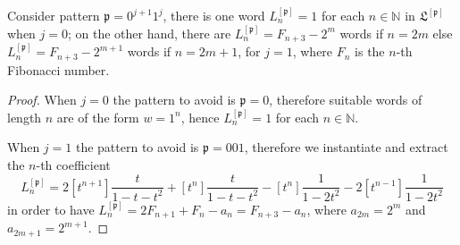 \begin{coro}
Consider pattern $\mathfrak{p}=0^{j+1}1^{j}$, there is one word
$L_{n}^{[\mathfrak{p}]} = 1$ for each $n\in\mathbb{N}$ in
$\mathfrak{L}^{[\mathfrak{p}]}$ when $j=0$; on the other hand, there are
$L_{n}^{[\mathfrak{p}]} = F_{n+3}-2^{m}$ words if $n=2m$ else
$L_{n}^{[\mathfrak{p}]} = F_{n+3}-2^{m+1}$ words if $n=2m+1$, for $j=1$, where
$F_{n}$ is the $n$-th Fibonacci number.
\end{coro}

\begin{proof}
When $j=0$ the pattern to avoid is $\mathfrak{p}=0$, therefore suitable
words of length $n$ are of the form $w=1^{n}$, hence $L_{n}^{[\mathfrak{p}]} =
1$ for each $n\in\mathbb{N}$.

When $j=1$ the pattern to avoid is $\mathfrak{p}=001$, therefore we instantiate and
extract the $n$-th coefficient
\begin{displaymath}
L_{n}^{[\mathfrak{p}]} = 2[t^{n+1}]\frac{t}{1-t-t^{2}} + [t^{n}]\frac{t}{1-t-t^{2}}
- [t^{n}]\frac{1}{1-2t^{2}} - 2[t^{n-1}]\frac{1}{1-2t^{2}}
\end{displaymath}
in order to have $L_{n}^{[\mathfrak{p}]} = 2F_{n+1} + F_{n} - a_{n} = F_{n+3} - a_{n}$,
where $a_{2m}=2^{m}$ and $a_{2m+1}=2^{m+1}$.


\end{proof}
